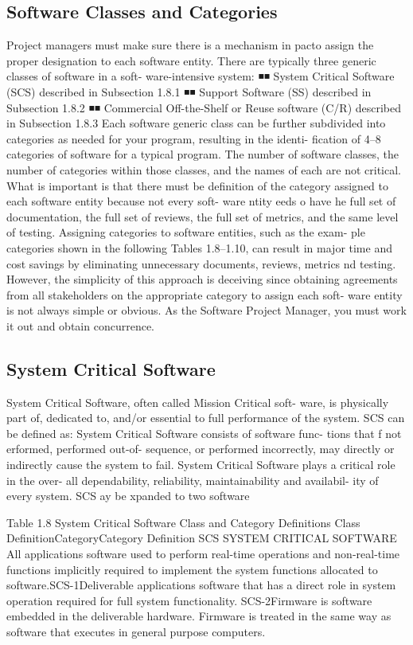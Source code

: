 \documentclass{book}
\begin{document}
\begin{multicols}{2}
\section{Software Classes and Categories}
Project managers must make sure there is a mechanism in
pacto assign the proper designation to each software entity.
There are typically three generic classes of software in a soft-
ware-intensive system:
◾◾ System Critical Software (SCS) described in Subsection
1.8.1
◾◾ Support Software (SS) described in Subsection 1.8.2
◾◾ Commercial Off-the-Shelf or Reuse software (C/R)
described in Subsection 1.8.3
Each software generic class can be further subdivided into
categories as needed for your program, resulting in the identi-
fication of 4–8 categories of software for a typical program.
The number of software classes, the number of categories
within those classes, and the names of each are not critical.
What is important is that there must be definition of the
category assigned to each software entity because not every soft-
ware ntity eeds o have he full set of documentation, the full
set of reviews, the full set of metrics, and the same level of testing.
Assigning categories to software entities, such as the exam-
ple categories shown in the following Tables 1.8–1.10, can
result in major time and cost savings by eliminating unnecessary
documents, reviews, metrics nd testing. However, the simplicity
of this approach is deceiving since obtaining agreements from
all stakeholders on the appropriate category to assign each soft-
ware entity is not always simple or obvious. As the Software
Project Manager, you must work it out and obtain concurrence.

\subsection{System Critical Software}
System Critical Software, often called Mission Critical soft-
ware, is physically part of, dedicated to, and/or essential to full
performance of the system. SCS can be defined as:
System Critical Software consists of software func-
tions that f not erformed, performed out-of-
sequence, or performed incorrectly, may directly or
indirectly cause the system to fail.
System Critical Software plays a critical role in the over-
all dependability, reliability, maintainability and availabil-
ity of every system. SCS ay be xpanded to two software


Table 1.8 System Critical Software Class and Category Definitions
Class DefinitionCategoryCategory Definition
SCS
SYSTEM CRITICAL SOFTWARE
All applications software used to perform real-time
operations and non-real-time functions implicitly
required to implement the system functions allocated
to software.SCS-1Deliverable applications software that has a
direct role in system operation required for
full system functionality.
SCS-2Firmware is software embedded in the
deliverable hardware. Firmware is treated in
the same way as software that executes in
general purpose computers.




\end{multicols}
\end{document}
